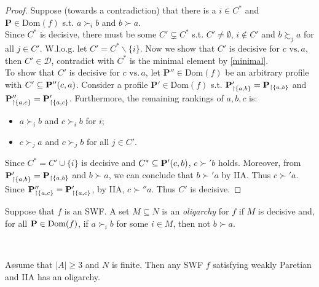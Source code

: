 \begin{proof}
    Suppose (towards a contradiction) that there is a $i \in C^\ast$ and $\mathbf{P} \in \mathrm{Dom}(f)$ s.t. $a \succ_i b$ and $b \succ a$.\\
    Since $C^\ast$ is decisive, there must be some $C' \subsetneq C^\ast$ s.t. $C' \neq \emptyset$, $i \not \in C'$ and $b \succsim_j a$ for all $j \in C'$. W.l.o.g. let $C' = C^\ast \backslash \{i\}$. Now we show that $C'$ is decisive for $c \mbox{ vs.}\, a$, then $C' \in \mathcal{D}$, contradict with $C^\ast$ is the minimal element by \cref{minimal}.\\
    To show that $C'$ is decisive for $c \mbox{ vs.}\, a$, let $\mathbf{P''} \in \mathrm{Dom}(f)$ be an arbitrary profile with $C' \subseteq \mathbf{P}''(c,a)$. Consider a profile $\mathbf{P'} \in \mathrm{Dom}(f)$ s.t. $\mathbf{P}'_{\upharpoonright \{a,b\}} = \mathbf{P}_{\upharpoonright \{a,b\}}$ and $\mathbf{P}''_{\upharpoonright \{a,c\}} = \mathbf{P}'_{\upharpoonright \{a,c\}}$. Furthermore, the remaining rankings of $a,b,c$ is:
    \begin{itemize}
        \item $a \succ_i b$ and $c \succ_i b$ for $i$;
        \item $c \succ_j a$ and $c \succ_j b$ for all $j \in C'$.
    \end{itemize}
    Since $C^\ast = C' \cup \{i\}$ is decisive and $C^\ast \subseteq \mathbf{P}'(c,b)$, $c \succ' b$ holds. Moreover, from $\mathbf{P}'_{\upharpoonright \{a,b\}} = \mathbf{P}_{\upharpoonright \{a,b\}}$ and $b \succ a$, we can conclude that $b \succ' a$ by IIA. Thus $c \succ' a$.\\
    Since $\mathbf{P}''_{\upharpoonright \{a,c\}} = \mathbf{P}'_{\upharpoonright \{a,c\}}$, by IIA, $c \succ'' a$. Thus $C'$ is decisive.
\end{proof}

\begin{definition}[Oligarchy]
    Suppose that $f$ is an SWF. A set $M \subseteq N$ is an \textit{oligarchy} for $f$ if $M$ is decisive and, for all $\mathbf{P} \in \mathrm{Dom}(f)$, if $a \succ_i b$ for some $i \in M$, then not $b \succ a$.
\end{definition}
~\\

\begin{theorem}
    \label{oligarchy}
    Assume that $|A| \geq 3$ and $N$ is finite. Then any SWF $f$ satisfying weakly Paretian and IIA has an oligarchy.
\end{theorem}

